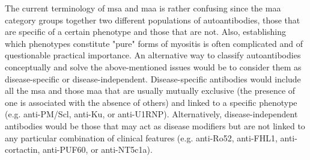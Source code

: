 The current terminology of \gls{msa} and \gls{maa} is rather confusing since the \gls{maa} category groups together two different populations of autoantibodies, those that are specific of a certain phenotype and those that are not. Also, establishing which phenotypes constitute "pure" forms of myositis is often complicated and of questionable practical importance. An alternative way to classify autoantibodies conceptually and solve the above-mentioned issues would be to consider them as disease-specific or disease-independent. Disease-specific antibodies would include all the \gls{msa} and those \gls{maa} that are usually mutually exclusive (the presence of one is associated with the absence of others) and linked to a specific phenotype (e.g. anti-PM/Scl, anti-Ku, or anti-U1RNP). Alternatively, disease-independent antibodies would be those that may act as disease modifiers but are not linked to any particular combination of clinical features (e.g. anti-Ro52, anti-FHL1, anti-cortactin, anti-PUF60, or anti-NT5c1a).
